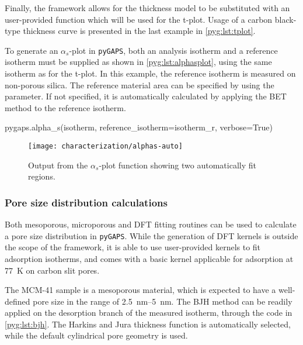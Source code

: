 Finally, the framework allows for the thickness model to be substituted
with an user-provided function which will be used for the t-plot.
Usage of a carbon black-type thickness curve is presented in the last
example in \autoref{pyg:lst:tplot}.

To generate an \(\alpha_s\)-plot in \texttt{pyGAPS}, both 
an analysis isotherm and a reference isotherm must be supplied 
as shown in \autoref{pyg:lst:alphasplot}, using the same isotherm
as for the t-plot.
In this example, the reference isotherm is measured on non-porous 
silica. The reference material area can be specified by using 
the  parameter. If not specified, it 
is automatically calculated by applying the BET
method to the reference isotherm.

\begin{python}[caption={Generating an \(\alpha_s\)-plot},label={pyg:lst:alphasplot}]
pygaps.alpha_s(isotherm, 
			   reference_isotherm=isotherm_r,
			   verbose=True)
\end{python}

\begin{figure}[!htb]
	\centering

	\texttt{[image: characterization/alphas-auto]}
	\caption{Output from the \(\alpha_s\)-plot function showing two
		automatically fit regions.}%
	\label{pyg:fig:alphasplot}

\end{figure}


\subsubsection{Pore size distribution calculations}

Both mesoporous, microporous and DFT fitting routines can be
used to calculate a pore size distribution in \texttt{pyGAPS}. 
While the generation of DFT kernels is outside the scope of the
framework, it is able to use user-provided kernels to fit adsorption 
isotherms, and comes with a basic kernel applicable for  
adsorption at \SI{77}{\kelvin} on carbon slit pores.

The MCM-41 sample is a mesoporous material, which is expected
to have a well-defined pore size in the range of 
\SIrange{2.5}{5}{\nano\metre}. The BJH method can be readily
applied on the desorption branch of the measured isotherm, through
the code in \autoref{pyg:lst:bjh}. The Harkins and Jura thickness
function is automatically selected, while the default cylindrical pore 
geometry is used.

